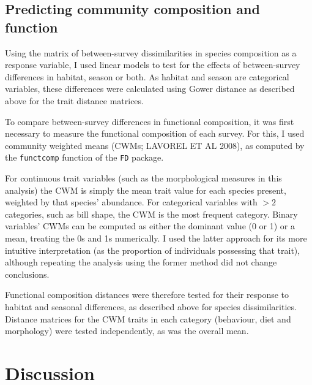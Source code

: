 \documentclass[12pt,a4paper,draft]{book}
\begin{document}
\subsection{Predicting community composition and function}

Using the matrix of between-survey dissimilarities in species composition as a response variable, I used linear models to test for the effects of between-survey differences in habitat, season or both. As habitat and season are categorical variables, these differences were calculated using Gower distance as described above for the trait distance matrices.

To compare between-survey differences in functional composition, it was first necessary to measure the functional composition of each survey. For this, I used community weighted means (CWMs; LAVOREL ET AL 2008), as computed by the \texttt{functcomp} function of the \texttt{FD} package. 

For continuous trait variables (such as the morphological measures in this analysis) the CWM is simply the mean trait value for each species present, weighted by that species' abundance. For categorical variables with $>2$ categories, such as bill shape, the CWM is the most frequent category. Binary variables' CWMs can be computed as either the dominant value (0 or 1) or a mean, treating the 0s and 1s numerically. I used the latter approach for its more intuitive interpretation (as the proportion of individuals possessing that trait), although repeating the analysis using the former method did not change conclusions.

Functional composition distances were therefore tested for their response to habitat and seasonal differences, as described above for species dissimilarities. Distance matrices for the CWM traits in each category (behaviour, diet and morphology) were tested independently, as was the overall mean.



\section{Discussion}

\printbibliography
\end{document}

